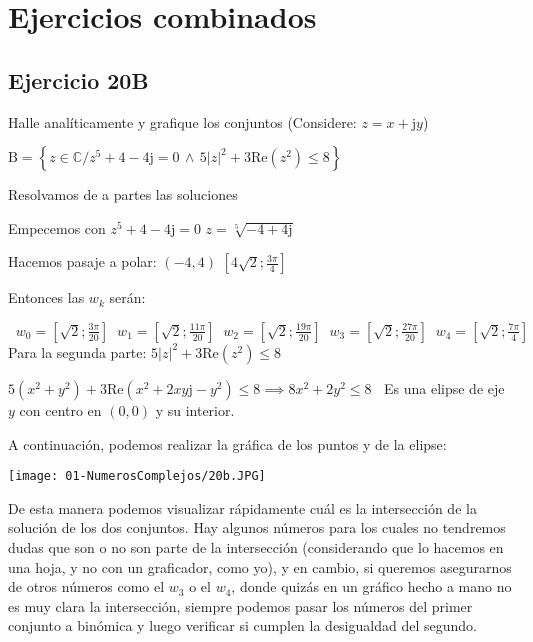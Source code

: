 \documentclass[11pt]{article}
\def\imj{\mathrm{j}}
\begin{document}
	\section{Ejercicios combinados}
	\subsection{Ejercicio 20B}
	Halle analíticamente y grafique los conjuntos (Considere: $z=x+\imj y$)
	
	$\mathrm{B}=\left\lbrace z\in\mathbb{C} / z^{5}+4-4\imj=0 \, \wedge \, 5\left|z\right|^{2}+3\mathrm{Re}\left(z^{2}\right) \leq 8 \right\rbrace$
	
	Resolvamos de a partes las soluciones
	
	Empecemos con $z^{5}+4-4\imj=0$ \textrightarrow $z=\sqrt[5]{-4+4\imj}$
	
	Hacemos pasaje a polar: $\left(-4, 4\right)$ \textrightarrow $\left[4\sqrt{2};\frac{3\pi}{4}\right]$
	
	Entonces las $w_{k}$ serán:
	
	$\boxed{\;\; w_{0}=\left[\sqrt{2}; \frac{3\pi}{20}\right] \;\; w_{1}=\left[\sqrt{2}; \frac{11\pi}{20}\right] \;\; w_{2}=\left[\sqrt{2}; \frac{19\pi}{20}\right] \;\; w_{3}=\left[\sqrt{2}; \frac{27\pi}{20}\right] \;\; w_{4}=\left[\sqrt{2}; \frac{7\pi}{4}\right] \;\;}$\vspace{0.5cm}\\
	
	Para la segunda parte: $5\left|z\right|^{2}+3\mathrm{Re}\left(z^{2}\right) \leq 8$
	
	$5\left(x^2+y^2\right)+3\mathrm{Re}\left(x^2+2xy\imj-y^2\right)\leq8\implies8x^2+2y^2\leq8\;\;$ Es una elipse de eje $y$ con centro en $\left(0,0\right)$ y su interior.
	
	A continuación, podemos realizar la gráfica de los puntos y de la elipse:

	\begin{center}
		\texttt{[image: 01-NumerosComplejos/20b.JPG]}
	\end{center}

	De esta manera podemos visualizar rápidamente cuál es la intersección de la solución de los dos conjuntos. Hay algunos números para los cuales no tendremos dudas que son o no son parte de la intersección (considerando que lo hacemos en una hoja, y no con un graficador, como yo), y en cambio, si queremos asegurarnos de otros números como el $w_{3}$ o el $w_{4}$, donde quizás en un gráfico hecho a mano no es muy clara la intersección, siempre podemos pasar los números del primer conjunto a binómica y luego verificar si cumplen la desigualdad del segundo.
	
\end{document}
